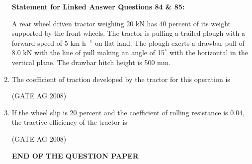 \documentclass[journal]{IEEEtran}
\begin{document}
\begin{enumerate}
\textbf{Statement for Linked Answer Questions 84 \& 85:}

A rear wheel driven tractor weighing 20 kN has 40 percent of its weight supported by the front wheels. The tractor is pulling a trailed plough with a forward speed of 5 km h$^{-1}$ on flat land. The plough exerts a drawbar pull of 8.0 kN with the line of pull making an angle of 15$^ \degree$ with the horizontal in the vertical plane. The drawbar hitch height is 500 mm.


\item 
 The coefficient of traction developed by the tractor for this operation is
\begin{enumerate}
\end{enumerate}
\hfill(GATE AG 2008)\\

\medskip

\item 
 If the wheel slip is 20 percent and the coefficient of rolling resistance is 0.04, the tractive efficiency of the tractor is
\begin{enumerate}
\end{enumerate}
\hfill(GATE AG 2008)\\

\medskip

\begin{center}
\textbf{END OF THE QUESTION PAPER}
\end{center}

\end{enumerate}
\end{document}
